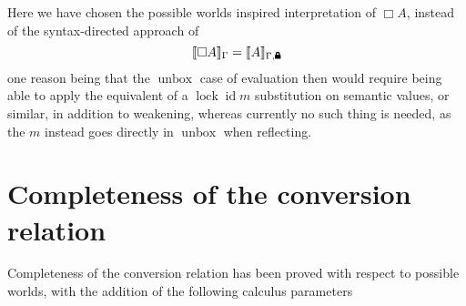 \documentclass{article}
\newcommand{\lock}{
  \text{\tikz[baseline]{
      \fill[rounded corners=.1ex] (-.75ex,0) rectangle (.75ex,1ex);
      \draw[line width=.3ex] (-.4ex,.5ex) -- ++(0,.75ex) arc (180:0:.4ex) -- ++(0,-.75ex);
}}}
\DeclareMathOperator\unbox{unbox}
\begin{document}
Here we have chosen the possible worlds inspired interpretation of $\Box A$,
instead of the syntax-directed approach of
$$ \llbracket \Box A \rrbracket_\Gamma = \llbracket A \rrbracket_{\Gamma, \lock}$$
one reason being that the $\unbox$ case of evaluation then would require
being able to apply the equivalent of a $\operatorname{lock} \operatorname{id} m$ substitution
on semantic values, or similar, in addition to weakening,
whereas currently no such thing is needed,
as the $m$ instead goes directly in $\unbox$ when reflecting.

\section{Completeness of the conversion relation}

Completeness of the conversion relation has been proved with respect to possible worlds,
with the addition of the following calculus parameters
\end{document}
